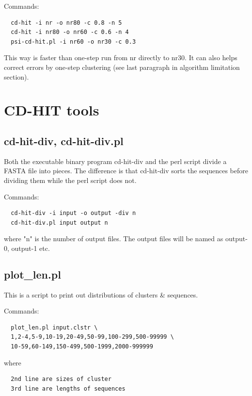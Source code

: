 \documentclass[12pt,a4paper]{article}
\begin{document}
Commands:

\begin{lstlisting}
  cd-hit -i nr -o nr80 -c 0.8 -n 5
  cd-hit -i nr80 -o nr60 -c 0.6 -n 4
  psi-cd-hit.pl -i nr60 -o nr30 -c 0.3
\end{lstlisting}

This way is faster than one-step run from nr directly to nr30. It can also
helps correct errors by one-step clustering (see last paragraph in algorithm
limitation section).  

\clearpage
\section{CD-HIT tools }

\subsection{cd-hit-div, cd-hit-div.pl }

Both the executable binary program cd-hit-div and the perl script divide a FASTA file into pieces. The difference is that cd-hit-div sorts the sequences before dividing them while the perl script does not.

Commands:

\begin{lstlisting}
  cd-hit-div -i input -o output -div n
  cd-hit-div.pl input output n
\end{lstlisting}

where "n" is the number of output files. The output files will be named as output-0, output-1 etc.

\subsection{plot\_len.pl }

This is a script to print out distributions of clusters \& sequences.  

Commands:

\begin{lstlisting}
  plot_len.pl input.clstr \
  1,2-4,5-9,10-19,20-49,50-99,100-299,500-99999 \
  10-59,60-149,150-499,500-1999,2000-999999
\end{lstlisting}

where

\begin{lstlisting}
  2nd line are sizes of cluster
  3rd line are lengths of sequences 
\end{lstlisting}
\end{document}
